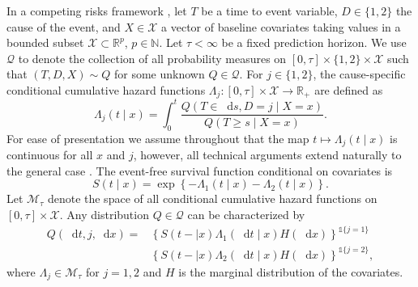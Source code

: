 \documentclass[lineno]{biometrika}
\newcommand{\R}{\mathbb{R}}
\newcommand{\N}{\mathbb{N}}
\newcommand*\diff{\mathop{}\!\mathrm{d}}
\newcommand{\1}{\mathds{1}}
\begin{document}
In a competing risks framework \citep{andersen2012statistical}, let \(
T\) be a time to event variable, \(D\in\{1,2\}\) the cause of the
event, and $X \in \mathcal{X}$ a vector of baseline covariates taking
values in a bounded subset \( \mathcal{X} \subset \R^p \), \( p\in\N
\). Let $\tau< \infty$ be a fixed prediction horizon. We use \(
\mathcal{Q} \) to denote the collection of all probability measures on
\( [0,\tau] \times \{1,2\}\times \mathcal{X} \) such that \( (T, D, X)
\sim Q \) for some unknown \( Q \in \mathcal{Q} \). For
\(j\in\{1,2\}\), the cause-specific conditional cumulative hazard
functions \( \Lambda_{j} \colon [0, \tau] \times \mathcal{X}
\rightarrow \R_+ \) are defined as
\begin{equation*}
  \Lambda_{j}(t \mid x) = \int_0^t\frac{  Q(T \in \diff s, D=j \mid X=x )}{Q(T \geq s \mid X=x )}.
\end{equation*} For ease of presentation we assume throughout that the
map \( t\mapsto \Lambda_j(t \mid x) \) is continuous for all \( x \)
and \( j \), however, 
all technical arguments extend naturally to the general case \citep{andersen2012statistical}.
The event-free survival function conditional on covariates is
\begin{equation}
  \label{eq:surv-def}
  S(t \mid x)=\exp\left\{-\Lambda_{1}(t \mid x)-\Lambda_{2}(t \mid x)\right\}.
\end{equation}
Let \( \mathcal{M}_{\tau}\) denote the space of all conditional
cumulative hazard functions on \( [0,\tau] \times\mathcal{X}\). Any
distribution \( Q \in \mathcal{Q} \) can be characterized by
\begin{equation*}
  \label{eq:parametrizeQ}
  \begin{split}
    Q(\diff t,j,\diff x)=& \left\{S(t- \mid x)\Lambda_1(\diff t \mid x)H(\diff x)\right\}^{\1{\{j=1\}}}\\
                         &  \left\{S(t- \mid x)\Lambda_2(\diff t \mid x)H(\diff x)\right\}^{\1{\{j=2\}}},
  \end{split}
\end{equation*}
where \(\Lambda_{j} \in \mathcal{M}_{\tau}\) for \(j=1,2\) and \(H\) is the marginal
distribution of the covariates.
\end{document}
